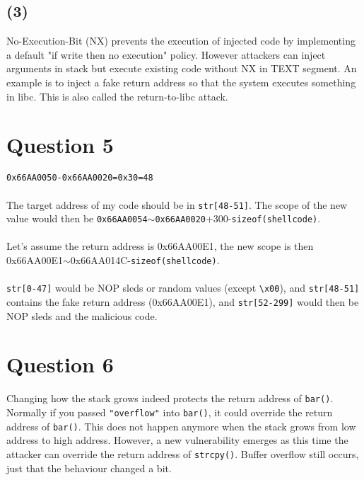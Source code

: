 \documentclass[a4paper]{article}
\begin{document}
\subsection*{(3)}
No-Execution-Bit (NX) prevents the execution of injected code by implementing a default "if write then no execution" policy. However attackers can inject arguments in stack but execute existing code without NX in TEXT segment. An example is to inject a fake return address so that the system executes something in libc. This is also called the return-to-libc attack.

\pagebreak

\section*{Question 5}
\verb+0x66AA0050-0x66AA0020=0x30=48+\\\\
The target address of my code should be in \verb+str[48-51]+. The scope of the new value would then be \verb+0x66AA0054+$\sim$\verb+0x66AA0020++300-\verb+sizeof(shellcode)+.\\\\
Let's assume the return address is 0x66AA00E1, the new scope is then 0x66AA00E1$\sim$0x66AA014C-\verb+sizeof(shellcode)+.\\\\
\verb+str[0-47]+ would be NOP sleds or random values (except \verb+\x00+), and \verb+str[48-51]+ contains the fake return address (0x66AA00E1), and \verb+str[52-299]+ would then be NOP sleds and the malicious code.

\section*{Question 6}
Changing how the stack grows indeed protects the return address of \verb+bar()+. Normally if you passed \verb+"overflow"+ into \verb+bar()+, it could override the return address of \verb+bar()+. This does not happen anymore when the stack grows from low address to high address. However, a new vulnerability emerges as this time the attacker can override the return address of \verb+strcpy()+. Buffer overflow still occurs, just that the behaviour changed a bit.
\end{document}
